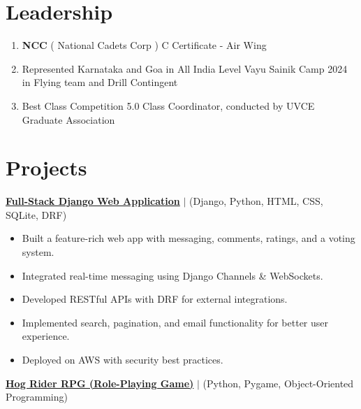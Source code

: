 \documentclass[a4paper,20pt]{article}
\begin{document}
\vspace{-7pt}
\vspace{2pt}
\section{Leadership}
\vspace{2pt}
\begin{enumerate}
\item {\textbf{NCC} ( National Cadets Corp ) C Certificate - Air Wing }
\vspace{-5pt}
\item {Represented Karnataka and Goa in All India Level Vayu Sainik Camp 2024 in Flying team 
 and Drill Contingent }
\vspace{-5pt}
\item { Best Class Competition 5.0  Class Coordinator, conducted by UVCE Graduate Association}
\vspace{-5pt}
\end{enumerate}
\vspace{-7pt}


\vspace{1pt} 
\section{Projects}
\vspace{2pt}
{\textbf{\ul{Full-Stack Django Web Application}}} \normalfont  \(\mid\) (Django, Python, HTML, CSS, SQLite, DRF)
\vspace{-5pt}

\begin{itemize}[itemsep=0pt]
  \item Built a feature-rich web app with messaging, comments, ratings, and a voting system.
 \item Integrated real-time messaging using Django Channels \& WebSockets.
\item Developed RESTful APIs with DRF for external integrations.
\item Implemented search, pagination, and email functionality for better user experience.
\item Deployed on AWS with security best practices.
\end{itemize}

\textbf{\ul{Hog Rider RPG (Role-Playing Game)}}\normalfont{ } \( \mid \) (Python, Pygame, Object-Oriented Programming)
\vspace{-5pt}
\end{document}
